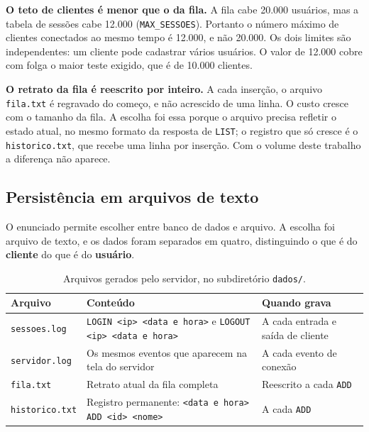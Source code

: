 \documentclass[12pt,a4paper]{article}
\begin{document}
\vspace{6pt}
\noindent\textbf{O teto de clientes é menor que o da fila.} A fila cabe 20.000
usuários, mas a tabela de sessões cabe 12.000
(\texttt{MAX\_SESSOES}). Portanto o número máximo de clientes conectados ao mesmo
tempo é 12.000, e não 20.000. Os dois limites são independentes: um cliente pode
cadastrar vários usuários. O valor de 12.000 cobre com folga o maior teste
exigido, que é de 10.000 clientes.

\vspace{6pt}
\noindent\textbf{O retrato da fila é reescrito por inteiro.} A cada inserção, o
arquivo \texttt{fila.txt} é regravado do começo, e não acrescido de uma linha. O
custo cresce com o tamanho da fila. A escolha foi essa porque o arquivo precisa
refletir o estado atual, no mesmo formato da resposta de \texttt{LIST}; o
registro que só cresce é o \texttt{historico.txt}, que recebe uma linha por
inserção. Com o volume deste trabalho a diferença não aparece.

\subsection{Persistência em arquivos de texto}
\label{sec:persistencia}

O enunciado permite escolher entre banco de dados e arquivo. A escolha foi
arquivo de texto, e os dados foram separados em quatro, distinguindo o que é do
\textbf{cliente} do que é do \textbf{usuário}.

\begin{table}[H]
\centering
\caption{Arquivos gerados pelo servidor, no subdiretório \texttt{dados/}.}
\footnotesize
\begin{tabular}{L{3.4cm} L{5.6cm} L{4.2cm}}
\toprule
\textbf{Arquivo} & \textbf{Conteúdo} & \textbf{Quando grava} \\
\midrule
\texttt{sessoes.log} & \texttt{LOGIN <ip> <data e hora>} e \texttt{LOGOUT <ip> <data e hora>} & A cada entrada e saída de cliente \\
\texttt{servidor.log} & Os mesmos eventos que aparecem na tela do servidor & A cada evento de conexão \\
\texttt{fila.txt} & Retrato atual da fila completa & Reescrito a cada \texttt{ADD} \\
\texttt{historico.txt} & Registro permanente: \texttt{<data e hora> ADD <id> <nome>} & A cada \texttt{ADD} \\
\bottomrule
\end{tabular}
\end{table}
\end{document}
